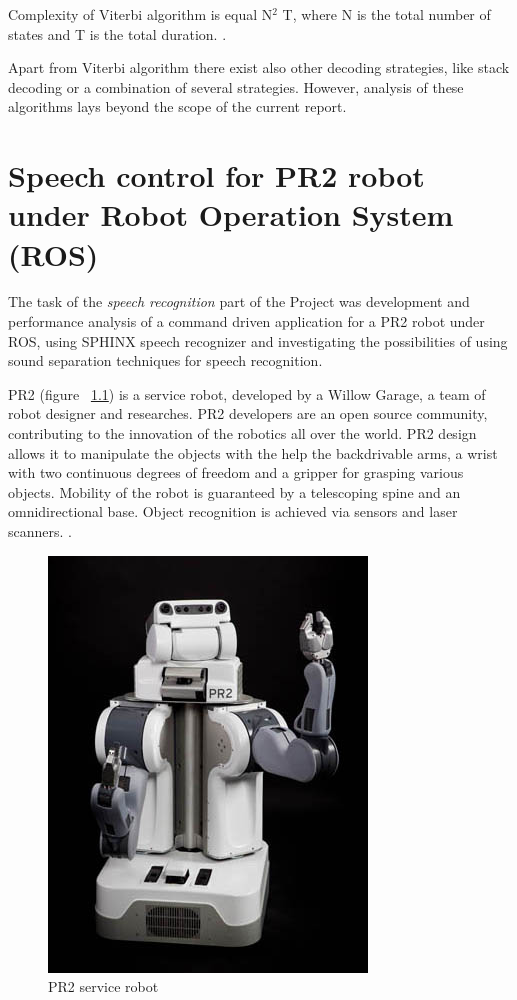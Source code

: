 \documentclass[11pt,a4paper]{report}
\begin{document}
 Complexity of
Viterbi algorithm is equal N$^2$ T, where N is the total number of states and
T is the total duration.  \citep{Ravishankar96efficientalgorithms}.  

 Apart from Viterbi algorithm there exist also other decoding
strategies, like stack decoding \citep{Ravishankar96efficientalgorithms} or a combination of 
several strategies.  However, analysis of these algorithms lays beyond the scope
of the current report. 


\chapter {Speech control for PR2 robot  under Robot Operation System (ROS)}
\label {sec:PR2}

The task of the \textit{speech recognition} part of the Project was development
and performance analysis of a command driven application for a PR2 robot under ROS,
using SPHINX speech recognizer and investigating the possibilities of using
sound separation techniques for speech recognition. 

PR2 (figure ~\ref {fig:PR2}) is a service robot, developed by a Willow  Garage, a team of robot designer and researches.  PR2 developers are an open source community, contributing to the innovation of the robotics all over the world.
PR2 design allows it to manipulate the objects with the help the backdrivable
arms, a wrist with two continuous degrees of freedom and a gripper for grasping
various objects. Mobility of the robot is  guaranteed by a telescoping spine and
an omnidirectional base. Object recognition is achieved via sensors and laser
scanners.  \citep {WillowGarage}.
\begin  {figure}[h]
\begin {center}
     \includegraphics[height=8.0 cm]{PR2}
     \caption {PR2 service robot}
     \label {fig:PR2}
     \end {center}
     \end {figure}
\end{document}
